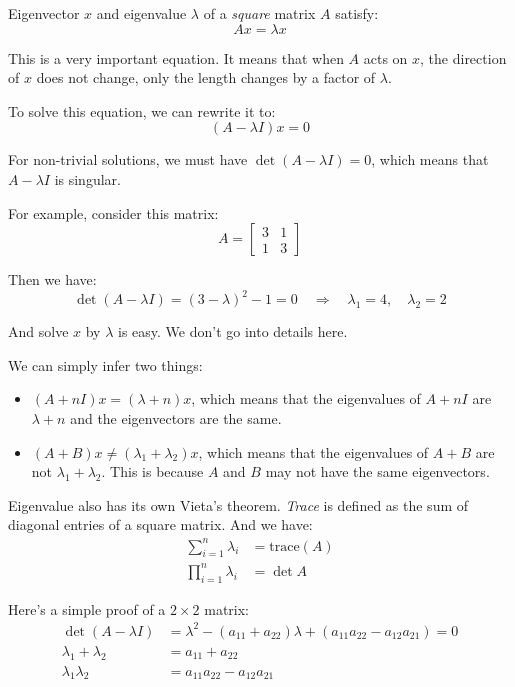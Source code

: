 \documentclass[10pt,a4paper,oneside,numbers=noenddot]{scrbook}
\theoremstyle{ctplain}
\theoremstyle{ctresult}
\begin{document}
Eigenvector $x$ and eigenvalue $\lambda$ of a \emph{square} matrix $A$ satisfy:
\[
  Ax = \lambda x
\]

This is a very important equation. It means that when $A$ acts on $x$, the direction of
$x$ does not change, only the length changes by a factor of $\lambda$.

To solve this equation, we can rewrite it to:
\[
  (A - \lambda I)x = 0
\]

For non-trivial solutions, we must have $\det(A - \lambda I) = 0$, which means that
$A - \lambda I$ is singular.

For example, consider this matrix:
\[
  A = \begin{bmatrix}
    3 & 1 \\
    1 & 3
  \end{bmatrix}
\]

Then we have:
\[
  \det(A - \lambda I) = (3 - \lambda)^2 - 1 = 0
  \quad \Rightarrow \quad
  \lambda_1 = 4, \quad \lambda_2 = 2
\]

And solve $x$ by $\lambda$ is easy. We don't go into details here.

We can simply infer two things:
\begin{itemize}
  \item $(A + nI) x = (\lambda + n) x$, which means that the eigenvalues of $A + nI$
  are $\lambda + n$ and the eigenvectors are the same.
  \item $(A + B) x \neq (\lambda_1  + \lambda_2) x$, which means that the eigenvalues
  of $A + B$ are not $\lambda_1 + \lambda_2$. This is because $A$ and $B$ may not
  have the same eigenvectors.
\end{itemize}

Eigenvalue also has its own Vieta's theorem. \emph{Trace} is defined as the sum of
diagonal entries of a square matrix. And we have:
\begin{align*}
  \sum_{i=1}^{n} \lambda_i &= \text{trace}(A) \\
  \prod_{i=1}^{n} \lambda_i &= \det A
\end{align*}

Here's a simple proof of a $2 \times 2$ matrix:
\begin{align*}
  \det(A - \lambda I) &=
  \lambda^2 - (a_{11} + a_{22})\lambda + (a_{11}a_{22} - a_{12}a_{21}) = 0 \\
  \lambda_1 + \lambda_2 &= a_{11} + a_{22} \\
  \lambda_1 \lambda_2 &= a_{11}a_{22} - a_{12}a_{21}
\end{align*}
\end{document}
